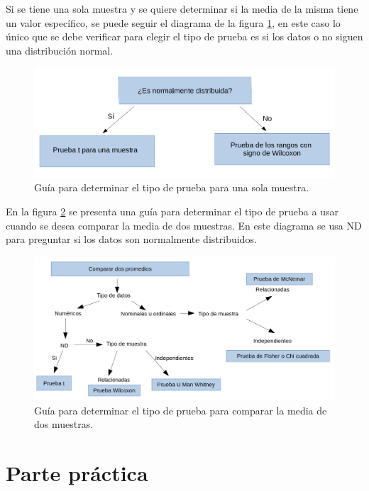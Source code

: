\documentclass[12pt]{article}
\begin{document}
	
	Si se tiene una sola muestra y se quiere determinar si la media de la misma tiene un valor específico, se puede seguir el diagrama de la figura \ref{unamuestra}, en este caso lo único que se debe verificar para elegir el tipo de prueba es si los datos o no siguen una distribución normal.
	
	\begin{figure}
		\centering
		\includegraphics[scale=0.3]{unamuestra.png}
		\caption{Guía para determinar el tipo de prueba para una sola muestra.}
		\label{unamuestra}		
	\end{figure}

	En la figura \ref{dosmuestras} se presenta una guía para determinar el tipo de prueba a usar cuando se desea comparar la media de dos muestras. En este diagrama se usa ND para preguntar si los datos son normalmente distribuidos.
	\begin{figure}
		\centering
		\includegraphics[scale=0.3]{dosmuestras.png}
		\caption{Guía para determinar el tipo de prueba para comparar la media de dos muestras.}
		\label{dosmuestras}		
	\end{figure}

	\section{Parte práctica}
	
\end{document}
